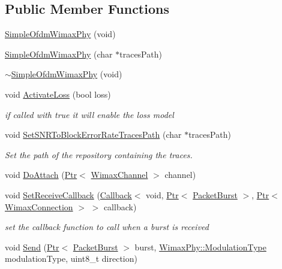 \subsection*{Public Member Functions}
\begin{DoxyCompactItemize}
\item 
\hyperlink{classns3_1_1SimpleOfdmWimaxPhy_ac75a81050a2e1e801481a10cffa23b5f}{Simple\+Ofdm\+Wimax\+Phy} (void)
\item 
\hyperlink{classns3_1_1SimpleOfdmWimaxPhy_a465820de1275828945f0be6f46b0e976}{Simple\+Ofdm\+Wimax\+Phy} (char $\ast$traces\+Path)
\item 
\hyperlink{classns3_1_1SimpleOfdmWimaxPhy_a7e614071b502545a9148c208b4db4e52}{$\sim$\+Simple\+Ofdm\+Wimax\+Phy} (void)
\item 
void \hyperlink{classns3_1_1SimpleOfdmWimaxPhy_a35f7e153a4d5d89ab348bfc1e70d0c89}{Activate\+Loss} (bool loss)
\begin{DoxyCompactList}\small\item\em if called with true it will enable the loss model \end{DoxyCompactList}\item 
void \hyperlink{classns3_1_1SimpleOfdmWimaxPhy_acfde2780c048f2f29d5ddd40189e3da8}{Set\+S\+N\+R\+To\+Block\+Error\+Rate\+Traces\+Path} (char $\ast$traces\+Path)
\begin{DoxyCompactList}\small\item\em Set the path of the repository containing the traces. \end{DoxyCompactList}\item 
void \hyperlink{classns3_1_1SimpleOfdmWimaxPhy_aae74bf4fb04134c6bd63b96f0c3ed7fb}{Do\+Attach} (\hyperlink{classns3_1_1Ptr}{Ptr}$<$ \hyperlink{classns3_1_1WimaxChannel}{Wimax\+Channel} $>$ channel)
\item 
void \hyperlink{classns3_1_1SimpleOfdmWimaxPhy_ada22a7e4e16badfc4c42331cb455070f}{Set\+Receive\+Callback} (\hyperlink{classns3_1_1Callback}{Callback}$<$ void, \hyperlink{classns3_1_1Ptr}{Ptr}$<$ \hyperlink{classns3_1_1PacketBurst}{Packet\+Burst} $>$, \hyperlink{classns3_1_1Ptr}{Ptr}$<$ \hyperlink{classns3_1_1WimaxConnection}{Wimax\+Connection} $>$ $>$ callback)
\begin{DoxyCompactList}\small\item\em set the callback function to call when a burst is received \end{DoxyCompactList}\item 
void \hyperlink{classns3_1_1SimpleOfdmWimaxPhy_ac39b27e0e9ce8d571f307fcc7d40d2ad}{Send} (\hyperlink{classns3_1_1Ptr}{Ptr}$<$ \hyperlink{classns3_1_1PacketBurst}{Packet\+Burst} $>$ burst, \hyperlink{classns3_1_1WimaxPhy_a044c5d8a48ca992c39c2a946f6e755fa}{Wimax\+Phy\+::\+Modulation\+Type} modulation\+Type, uint8\+\_\+t direction)

\end{DoxyCompactItemize}
